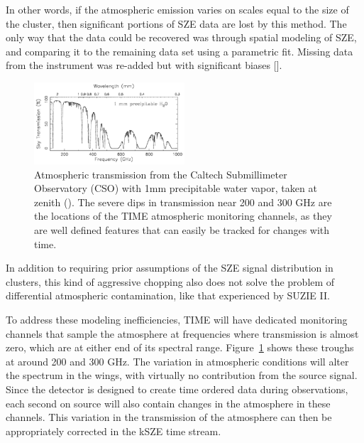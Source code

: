 \documentclass[manuscript]{aastex}
\begin{document}
In other words, if the atmospheric emission varies on scales equal to the size of the cluster, then significant portions of SZE data are lost by this method. The only way that the data could be recovered was through spatial modeling of SZE, and comparing it to the remaining data set using a parametric fit. Missing data from the instrument was re-added but with significant biases [\cite{Sayers2013b}].  
\begin{figure}
\vspace{-0.8cm}
  \begin{center}
    \includegraphics[width=0.5\textwidth]{atmos.PNG}
   \end{center}
\caption[Atmospheric Transmission from the CSO -(\cite{Weisstein1996})]{Atmospheric transmission from the Caltech Submillimeter Observatory (CSO) with 1mm precipitable water vapor, taken at zenith (\cite{Weisstein1996}). The severe dips in transmission near 200 and 300 GHz are the locations of the TIME atmospheric monitoring channels, as they are well defined features that can easily be tracked for changes with time.}
\label{fig:atmos}
\vspace{-0.8cm}
\end{figure}
In addition to requiring prior assumptions of the SZE signal distribution in clusters, this kind of aggressive chopping also does not solve the problem of differential atmospheric contamination, like that experienced by SUZIE II.

To address these modeling inefficiencies, TIME will have dedicated monitoring channels that sample the atmosphere at frequencies where transmission is almost zero, which are at either end of its spectral range. Figure~\ref{fig:atmos} shows these troughs at around 200 and 300 GHz. The variation in atmospheric conditions will alter the spectrum in the wings, with virtually no contribution from the source signal. Since the detector is designed to create time ordered data during observations, each second on source will also contain changes in the atmosphere in these channels. This variation in the transmission of the atmosphere can then be appropriately corrected in the kSZE time stream. 
\end{document}
